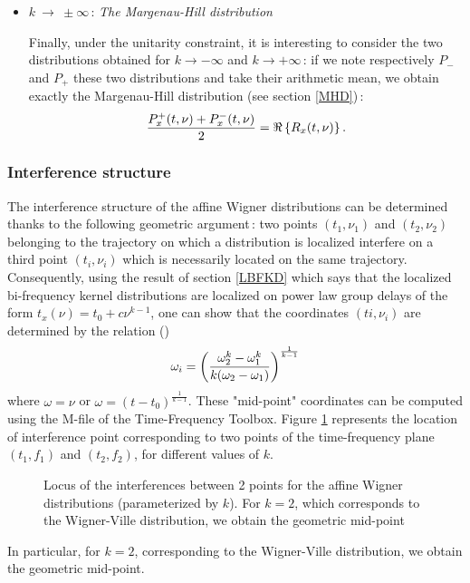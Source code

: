 \begin{itemize}
\item $k\ \rightarrow\ \pm\infty$\,: {\it The Margenau-Hill
distribution}

  Finally, under the unitarity constraint, it is interesting to consider
the two distributions obtained for $k\rightarrow -\infty$ and $k
\rightarrow +\infty$\,: if we note respectively $P_-$ and $P_+$ these two
distributions and take their arithmetic mean, we obtain exactly the
Margenau-Hill distribution (see section \ref{MHD})\,:
\[{P_x^+(t,\nu)+P_x^-(t,\nu)\over 2}=\Re\left\{R_x(t,\nu)\right\}.\]
\end{itemize}	

\subsubsection{Interference structure}
  The interference structure of the affine Wigner distributions can be
determined thanks to the following geometric argument\,: two points
$(t_1,\nu_1)$ and $(t_2,\nu_2)$ belonging to the trajectory on which a
distribution is localized interfere on a third point $(t_i,\nu_i)$ which is
necessarily located on the same trajectory. Consequently, using the result
of section \ref{LBFKD} which says that the localized bi-frequency kernel
distributions are localized on power law group delays of the form
$t_x(\nu)=t_0+c\nu^{k-1}$, one can show that the coordinates $(ti,\nu_i)$
are determined by the relation (\cite{GON92})
\[\omega_i=\left({\omega_2^k-\omega_1^k\over k(\omega_2-\omega_1)}\right)
^{\frac{1}{k-1}}\] where $\omega=\nu$ or $\omega=(t-t_0)^{\frac{1}{k-1}}$.
These "mid-point" coordinates can be computed using the M-file
 of the Time-Frequency
Toolbox. Figure \ref{En2fig9} represents the location of interference point
corresponding to two points of the time-frequency plane $(t_1,f_1)$ and
$(t_2,f_2)$, for different values of $k$.
\begin{figure}[htb]
\epsfxsize=10cm
\epsfysize=8cm
\centerline{}
\caption{\label{En2fig9}Locus of the interferences between 2 points for the
affine Wigner distributions (parameterized by $k$). For $k=2$, which
corresponds to the Wigner-Ville distribution, we obtain the geometric
mid-point}
\end{figure}
In particular, for $k=2$, corresponding to the Wigner-Ville distribution, we
obtain the geometric mid-point.

